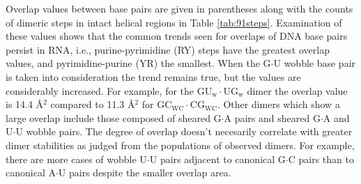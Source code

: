 Overlap values between base pairs  are given in parentheses along with
the  counts  of dimeric  steps  in  intact  helical regions  in  Table
\ref{tab:91steps}. Examination  of these values shows  that the common
trends  seen for  overlaps of  DNA base  pairs persist  in  RNA, i.e.,
purine-pyrimidine  (RY) steps  have the  greatest overlap  values, and
pyrimidine-purine (YR)  the smallest.  When the  G$\cdot$U wobble base
pair  is taken  into consideration  the  trend remains  true, but  the
values   are   considerably   increased.    For   example,   for   the
GU$_{\text{w}}\cdot$UG$_{\text{w}}$  dimer the  overlap value  is 14.4
\AA$^{\text{2}}$    compared     to    11.3    \AA$^{\text{2}}$    for
GC$_{\text{WC}}\cdot$CG$_{\text{WC}}$. Other dimers which show a large
overlap include those composed  of sheared G$\cdot$A pairs and sheared
G$\cdot$A and  U$\cdot$U wobble pairs.  The degree  of overlap doesn't
necesarily correlate with greater dimer stabilities as judged from the
populations of observed  dimers. For example, there are  more cases of
wobble U$\cdot$U  pairs adjacent to canonical G$\cdot$C  pairs than to
canonical A$\cdot$U pairs despite the smaller overlap area.

